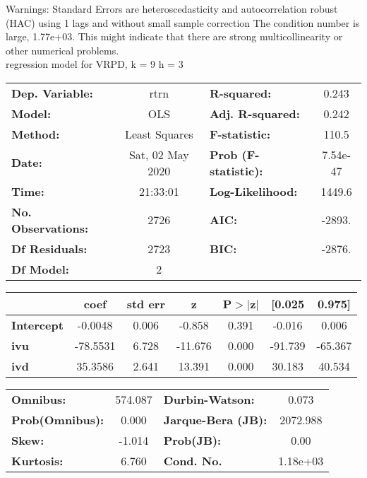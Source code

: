 Warnings: \newline
 [1] Standard Errors are heteroscedasticity and autocorrelation robust (HAC) using 1 lags and without small sample correction \newline
 [2] The condition number is large, 1.77e+03. This might indicate that there are \newline
 strong multicollinearity or other numerical problems.\\ 

regression model for VRPD, k = 9 h = 3\begin{center}
\begin{tabular}{lclc}
\toprule
\textbf{Dep. Variable:}    &       rtrn       & \textbf{  R-squared:         } &     0.243   \\
\textbf{Model:}            &       OLS        & \textbf{  Adj. R-squared:    } &     0.242   \\
\textbf{Method:}           &  Least Squares   & \textbf{  F-statistic:       } &     110.5   \\
\textbf{Date:}             & Sat, 02 May 2020 & \textbf{  Prob (F-statistic):} &  7.54e-47   \\
\textbf{Time:}             &     21:33:01     & \textbf{  Log-Likelihood:    } &    1449.6   \\
\textbf{No. Observations:} &        2726      & \textbf{  AIC:               } &    -2893.   \\
\textbf{Df Residuals:}     &        2723      & \textbf{  BIC:               } &    -2876.   \\
\textbf{Df Model:}         &           2      & \textbf{                     } &             \\
\bottomrule
\end{tabular}
\begin{tabular}{lcccccc}
                   & \textbf{coef} & \textbf{std err} & \textbf{z} & \textbf{P$> |$z$|$} & \textbf{[0.025} & \textbf{0.975]}  \\
\midrule
\textbf{Intercept} &      -0.0048  &        0.006     &    -0.858  &         0.391        &       -0.016    &        0.006     \\
\textbf{ivu}       &     -78.5531  &        6.728     &   -11.676  &         0.000        &      -91.739    &      -65.367     \\
\textbf{ivd}       &      35.3586  &        2.641     &    13.391  &         0.000        &       30.183    &       40.534     \\
\bottomrule
\end{tabular}
\begin{tabular}{lclc}
\textbf{Omnibus:}       & 574.087 & \textbf{  Durbin-Watson:     } &    0.073  \\
\textbf{Prob(Omnibus):} &   0.000 & \textbf{  Jarque-Bera (JB):  } & 2072.988  \\
\textbf{Skew:}          &  -1.014 & \textbf{  Prob(JB):          } &     0.00  \\
\textbf{Kurtosis:}      &   6.760 & \textbf{  Cond. No.          } & 1.18e+03  \\
\bottomrule
\end{tabular}
\end{center}

